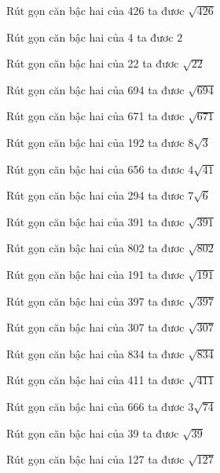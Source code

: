 \documentclass[12pt,a4paper]{article}
\begin{document}
\begin{ex}
Rút gọn căn bậc hai của 426 ta đươc $\sqrt{426}$
\end{ex}
\begin{ex}
Rút gọn căn bậc hai của 4 ta đươc $2$
\end{ex}
\begin{ex}
Rút gọn căn bậc hai của 22 ta đươc $\sqrt{22}$
\end{ex}
\begin{ex}
Rút gọn căn bậc hai của 694 ta đươc $\sqrt{694}$
\end{ex}
\begin{ex}
Rút gọn căn bậc hai của 671 ta đươc $\sqrt{671}$
\end{ex}
\begin{ex}
Rút gọn căn bậc hai của 192 ta đươc $8\sqrt{3}$
\end{ex}
\begin{ex}
Rút gọn căn bậc hai của 656 ta đươc $4\sqrt{41}$
\end{ex}
\begin{ex}
Rút gọn căn bậc hai của 294 ta đươc $7\sqrt{6}$
\end{ex}
\begin{ex}
Rút gọn căn bậc hai của 391 ta đươc $\sqrt{391}$
\end{ex}
\begin{ex}
Rút gọn căn bậc hai của 802 ta đươc $\sqrt{802}$
\end{ex}
\begin{ex}
Rút gọn căn bậc hai của 191 ta đươc $\sqrt{191}$
\end{ex}
\begin{ex}
Rút gọn căn bậc hai của 397 ta đươc $\sqrt{397}$
\end{ex}
\begin{ex}
Rút gọn căn bậc hai của 307 ta đươc $\sqrt{307}$
\end{ex}
\begin{ex}
Rút gọn căn bậc hai của 834 ta đươc $\sqrt{834}$
\end{ex}
\begin{ex}
Rút gọn căn bậc hai của 411 ta đươc $\sqrt{411}$
\end{ex}
\begin{ex}
Rút gọn căn bậc hai của 666 ta đươc $3\sqrt{74}$
\end{ex}
\begin{ex}
Rút gọn căn bậc hai của 39 ta đươc $\sqrt{39}$
\end{ex}
\begin{ex}
Rút gọn căn bậc hai của 127 ta đươc $\sqrt{127}$
\end{ex}
\end{document}
